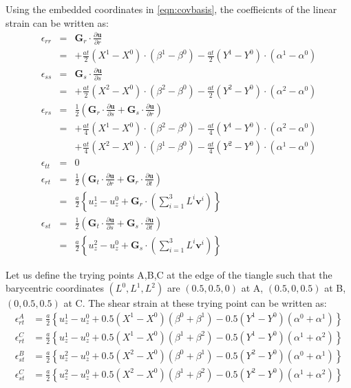 \documentclass{article}
\begin{document}
Using the embedded coordinates in \eqref{eqn:covbasis}, the coeffieicnts of the linear strain can be written as: 
%
\begin{eqnarray}
\epsilon_{rr} 
&=& \textbf{G}_r\cdot\frac{\partial\textbf{u}}{\partial r} \\ 
&=& +\frac{at}{2}(X^1-X^0)\cdot(\beta^1-\beta^0) - \frac{at}{2}(Y^1-Y^0)\cdot(\alpha^1-\alpha^0)\\
\epsilon_{ss} 
&=& \textbf{G}_s\cdot\frac{\partial\textbf{u}}{\partial s} \\ 
&=& +\frac{at}{2}(X^2-X^0)\cdot(\beta^2-\beta^0) - \frac{at}{2}(Y^2-Y^0)\cdot(\alpha^2-\alpha^0)\\
\epsilon_{rs} 
&=& \frac{1}{2}\left(\textbf{G}_r\cdot\frac{\partial\textbf{u}}{\partial s} + \textbf{G}_s\cdot\frac{\partial\textbf{u}}{\partial r} \right) \\ 
&=& +\frac{at}{4}(X^1-X^0)\cdot(\beta^2-\beta^0) - \frac{at}{4}(Y^1-Y^0)\cdot(\alpha^2-\alpha^0)\nonumber\\
&& +\frac{at}{4}(X^2-X^0)\cdot(\beta^1-\beta^0) - \frac{at}{4}(Y^2-Y^0)\cdot(\alpha^1-\alpha^0)\\
\epsilon_{tt} &=& 0\\
\epsilon_{rt} 
&=&  \frac{1}{2}\left(\textbf{G}_t\cdot\frac{\partial\textbf{u}}{\partial r} + \textbf{G}_r\cdot\frac{\partial\textbf{u}}{\partial t} \right) \\
&=& \frac{a}{2}\left\{u^1_z-u^0_z+\textbf{G}_r\cdot\left(\sum_{i=1}^3 L^i\textbf{v}^i\right) \right\}\\
\epsilon_{st} 
&=&  \frac{1}{2}\left(\textbf{G}_t\cdot\frac{\partial\textbf{u}}{\partial s} + \textbf{G}_s\cdot\frac{\partial\textbf{u}}{\partial t} \right)\\
&=& \frac{a}{2}\left\{u^2_z-u^0_z+\textbf{G}_s\cdot\left(\sum_{i=1}^3 L^i\textbf{v}^i\right)\right\}
\end{eqnarray}


Let us define the trying points A,B,C at the edge of the tiangle such that the barycentric coordinates $(L^0,L^1,L^2)$ are $(0.5,0.5,0)$ at A, $(0.5,0,0.5)$ at B, $(0,0.5,0.5)$ at C.
%
The shear strain at these trying point can be written as:
%
\begin{align}
\epsilon_{rt}^A &= \frac{a}{2}\left\{u^1_z-u^0_z+0.5(X^1-X^0)(\beta^0+\beta^1)-0.5(Y^1-Y^0)(\alpha^0+\alpha^1) \right\}\\
\epsilon_{rt}^C &= \frac{a}{2}\left\{u^1_z-u^0_z+0.5(X^1-X^0)(\beta^1+\beta^2)-0.5(Y^1-Y^0)(\alpha^1+\alpha^2) \right\}\\
\epsilon_{st}^B &= \frac{a}{2}\left\{u^2_z-u^0_z+0.5(X^2-X^0)(\beta^0+\beta^1)-0.5(Y^2-Y^0)(\alpha^0+\alpha^1) \right\}\\
\epsilon_{st}^C &= \frac{a}{2}\left\{u^2_z-u^0_z+0.5(X^2-X^0)(\beta^1+\beta^2)-0.5(Y^2-Y^0)(\alpha^1+\alpha^2) \right\}
\end{align}
\end{document}
